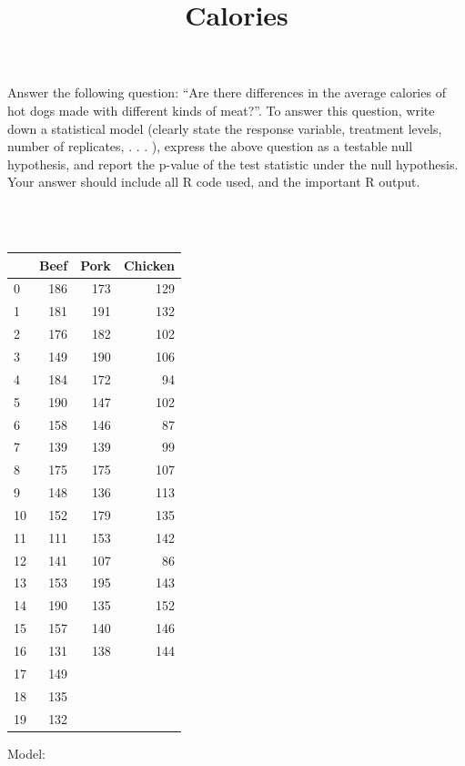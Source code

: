 \documentclass[11pt]{article}
\begin{document}
    Answer the following question: ``Are there differences in the average
calories of hot dogs made with different kinds of meat?''. To answer
this question, write down a statistical model (clearly state the
response variable, treatment levels, number of replicates, . . . ),
express the above question as a testable null hypothesis, and report the
p-value of the test statistic under the null hypothesis. Your answer
should include all R code used, and the important R output.
\begin{table}[H]
\centering
\title{Calories}\\\
\begin{tabular}{|l|r|r|r|}
	\toprule
	{} &  Beef &  Pork &  Chicken \\
	\midrule
	0  &   186 &   173 &      129 \\
	1  &   181 &   191 &      132 \\
	2  &   176 &   182 &      102 \\
	3  &   149 &   190 &      106 \\
	4  &   184 &   172 &       94 \\
	5  &   190 &   147 &      102 \\
	6  &   158 &   146 &       87 \\
	7  &   139 &   139 &       99 \\
	8  &   175 &   175 &      107 \\
	9  &   148 &   136 &      113 \\
	10 &   152 &   179 &      135 \\
	11 &   111 &   153 &      142 \\
	12 &   141 &   107 &       86 \\
	13 &   153 &   195 &      143 \\
	14 &   190 &   135 &      152 \\
	15 &   157 &   140 &      146 \\
	16 &   131 &   138 &      144 \\
	17 &   149 &      &         \\
	18 &   135 &      &         \\
	19 &   132 &      &         \\
	\bottomrule
\end{tabular}
\end{table}

    Model:
\end{document}
